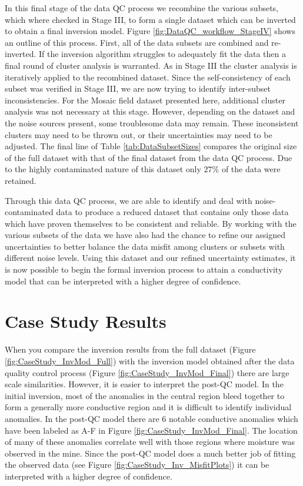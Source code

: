 \documentclass[final,authoryear,5p,times,twocolumn]{elsarticle}
\begin{document}
In this final stage of the data QC process we recombine the various subsets, which where checked in Stage III, to form a single dataset which can be inverted to obtain a final inversion model. Figure \ref{fig:DataQC_workflow_StageIV} shows an outline of this process. First, all of the data subsets are combined and re-inverted. If the inversion algorithm struggles to adequately fit the data then a final round of cluster analysis is warranted. As in Stage III the cluster analysis is iteratively applied to the recombined dataset. Since the self-consistency of each subset was verified in Stage III, we are now trying to identify inter-subset inconsistencies. For the Mosaic field dataset presented here, additional cluster analysis was not necessary at this stage. However, depending on the dataset and the noise sources present, some troublesome data may remain. These inconsistent clusters may need to be thrown out, or their uncertainties may need to be adjusted. The final line of Table \ref{tab:DataSubsetSizes} compares the original size of the full dataset with that of the final dataset from the data QC process. Due to the highly contaminated nature of this dataset only $27\%$ of the data were retained.

Through this data QC process, we are able to identify and deal with noise-contaminated data to produce a reduced dataset that contains only those data which have proven themselves to be consistent and reliable. By working with the various subsets of the data we have also had the chance to refine our assigned uncertainties to better balance the data misfit among clusters or subsets with different noise levels. Using this dataset and our refined uncertainty estimates, it is now possible to begin the formal inversion process to attain a conductivity model that can be interpreted with a higher degree of confidence.


\section{Case Study Results}
\label{Case_Study_Results}

When you compare the inversion results from the full dataset (Figure \ref{fig:CaseStudy_InvMod_Full}) with the inversion model obtained after the data quality control process (Figure \ref{fig:CaseStudy_InvMod_Final}) there are large scale similarities. However, it is easier to interpret the post-QC model. In the initial inversion, most of the anomalies in the central region bleed together to form a generally more conductive region and it is difficult to identify individual anomalies. In the post-QC model there are 6 notable conductive anomalies which have been labeled as A-F in Figure \ref{fig:CaseStudy_InvMod_Final}. The location of many of these anomalies correlate well with those regions where moisture was observed in the mine. Since the post-QC model does a much better job of fitting the observed data (see Figure \ref{fig:CaseStudy_Inv_MisfitPlots}) it can be interpreted with a higher degree of confidence.
\end{document}
